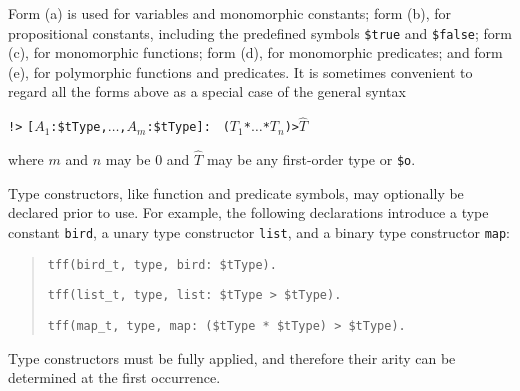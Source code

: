 Form (a) is used for variables and monomorphic constants; form (b), for
propositional constants, including the predefined symbols \verb+$true+ and
\verb+$false+; form (c), for monomorphic functions; form (d), for monomorphic
predicates; and form (e), for polymorphic functions and predicates.
It is sometimes convenient to regard all the forms above as a special case of
the general syntax
\begin{center}
{\tt !>} {\tt [$A_1$\;:\;\$tType,\;${\dots}$,\;$A_m$\;:\;\$tType]:} {\tt
($T_1$\;*\;${\dots}$\;*\;$T_n$)\;>\;$\widehat T$}
\end{center}
where $m$ and $n$ may be 0 and $\widehat T$ may be any first-order type or
{\tt \$o}.



 Type constructors,
like function and predicate symbols,
may optionally be declared prior to use.
For example, the following declarations introduce a type
constant {\tt bird}, a unary type constructor {\tt list},
and a binary type constructor {\tt map}:
\begin{quote}
\verb+tff(bird_t, type, bird: $tType).+
\par\smallskip
\verb+tff(list_t, type, list: $tType > $tType).+
\par\smallskip
\verb+tff(map_t, type, map: ($tType * $tType) > $tType).+
\end{quote}
Type constructors must be fully applied, and therefore
their arity can be %
determined at the first occurrence.

